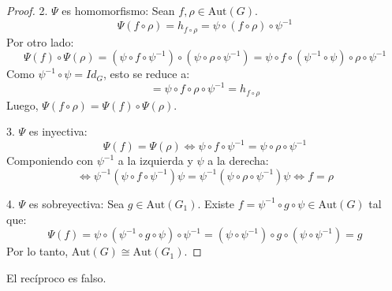 \begin{proof}
    2. $\Psi$ es homomorfismo:
    Sean $f, \rho \in \text{Aut}(G)$.
    \begin{equation*}
        \Psi(f \circ \rho) = h_{f \circ \rho} = \psi \circ (f \circ \rho) \circ \psi^{-1}
    \end{equation*}
    Por otro lado:
    \begin{equation*}
        \Psi(f) \circ \Psi(\rho) = (\psi \circ f \circ \psi^{-1}) \circ (\psi \circ \rho \circ \psi^{-1}) = \psi \circ f \circ (\psi^{-1} \circ \psi) \circ \rho \circ \psi^{-1}
    \end{equation*}
    Como $\psi^{-1} \circ \psi = Id_G$, esto se reduce a:
    \begin{equation*}
        = \psi \circ f \circ \rho \circ \psi^{-1} = h_{f \circ \rho}
    \end{equation*}
    Luego, $\Psi(f \circ \rho) = \Psi(f) \circ \Psi(\rho)$.

    3. $\Psi$ es inyectiva:
    \begin{equation*}
        \Psi(f) = \Psi(\rho) \iff \psi \circ f \circ \psi^{-1} = \psi \circ \rho \circ \psi^{-1}
    \end{equation*}
    Componiendo con $\psi^{-1}$ a la izquierda y $\psi$ a la derecha:
    \begin{equation*}
        \iff \psi^{-1} (\psi \circ f \circ \psi^{-1}) \psi = \psi^{-1} (\psi \circ \rho \circ \psi^{-1}) \psi \iff f = \rho
    \end{equation*}

    4. $\Psi$ es sobreyectiva:
    Sea $g \in \text{Aut}(G_1)$. Existe $f = \psi^{-1} \circ g \circ \psi \in \text{Aut}(G)$ tal que:
    \begin{equation*}
        \Psi(f) = \psi \circ (\psi^{-1} \circ g \circ \psi) \circ \psi^{-1} = (\psi \circ \psi^{-1}) \circ g \circ (\psi \circ \psi^{-1}) = g
    \end{equation*}
    Por lo tanto, $\text{Aut}(G) \cong \text{Aut}(G_1)$.
\end{proof}

\begin{obs}
    El recíproco es falso.
\end{obs}

